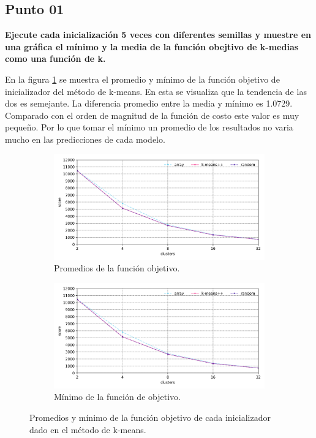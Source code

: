 \subsection*{Punto 01}

\textbf{Ejecute cada inicialización 5 veces con diferentes semillas y muestre en una gráfica el mínimo y la media de la función obejtivo de k-medias como una función de k.}

En la figura \ref{fig:problema_04_mean_and_minimum} se muestra el promedio y mínimo de la función objetivo de inicializador del método de k-means. En esta se visualiza que la tendencia de las dos es semejante. La diferencia promedio entre la media y mínimo es 1.0729. Comparado con el orden de magnitud de la función de costo este valor es muy pequeño. Por lo que tomar el mínimo un promedio de los resultados no varia mucho en las predicciones de cada modelo.

\begin{figure}[H]
    \centering
    \begin{subfigure}{16cm}
        \includegraphics[width=16cm]{Graphics/Problema_04/mean_scores.png}
        \caption{Promedios de la función objetivo.}
    \end{subfigure}
    \begin{subfigure}{16cm}
        \includegraphics[width=16cm]{Graphics/Problema_04/minimum_scores.png}
        \caption{Mínimo de la función de objetivo.}
    \end{subfigure}
    \caption{Promedios y mínimo de la función objetivo de cada inicializador dado en el método de k-means.}
    \label{fig:problema_04_mean_and_minimum}
\end{figure}